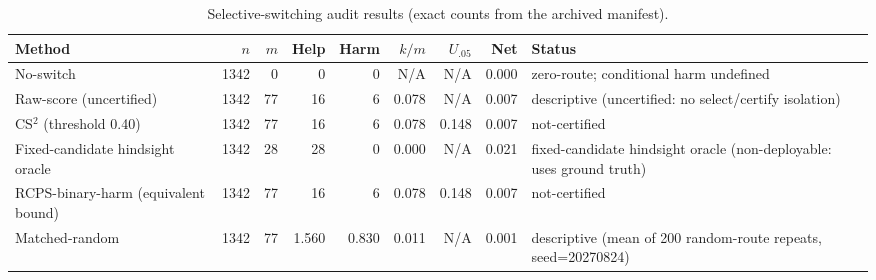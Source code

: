 \begin{table}[t]
\centering
\caption{Selective-switching audit results (exact counts from the archived manifest).}
\label{tab:cs2_main}
\begin{tabular}{lrrrrrrrl}
\toprule
Method & $n$ & $m$ & Help & Harm & $k/m$ & $U_{.05}$ & Net & Status \\
\midrule
No-switch & 1342 & 0 & 0 & 0 & N/A & N/A & 0.000 & zero-route; conditional harm undefined \\
Raw-score (uncertified) & 1342 & 77 & 16 & 6 & 0.078 & N/A & 0.007 & descriptive (uncertified: no select/certify isolation) \\
CS$^2$ (threshold 0.40) & 1342 & 77 & 16 & 6 & 0.078 & 0.148 & 0.007 & not-certified \\
Fixed-candidate hindsight oracle & 1342 & 28 & 28 & 0 & 0.000 & N/A & 0.021 & fixed-candidate hindsight oracle (non-deployable: uses ground truth) \\
RCPS-binary-harm (equivalent bound) & 1342 & 77 & 16 & 6 & 0.078 & 0.148 & 0.007 & not-certified \\
Matched-random & 1342 & 77 & 1.560 & 0.830 & 0.011 & N/A & 0.001 & descriptive (mean of 200 random-route repeats, seed=20270824) \\
\bottomrule
\end{tabular}
\end{table}
